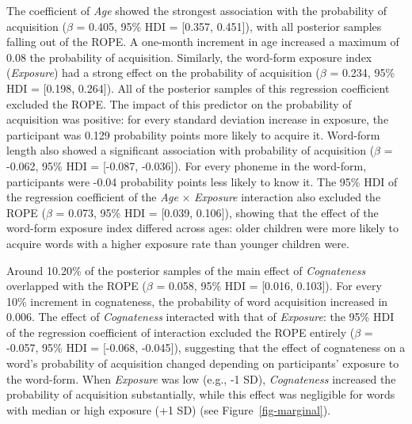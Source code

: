 \documentclass[
]{article}
\begin{document}
The coefficient of \emph{Age} showed the strongest association with the
probability of acquisition (\(\beta\) = 0.405, 95\% HDI = {[}0.357,
0.451{]}), with all posterior samples falling out of the ROPE. A
one-month increment in age increased a maximum of 0.08 the probability
of acquisition. Similarly, the word-form exposure index
(\emph{Exposure}) had a strong effect on the probability of acquisition
(\(\beta\) = 0.234, 95\% HDI = {[}0.198, 0.264{]}). All of the posterior
samples of this regression coefficient excluded the ROPE. The impact of
this predictor on the probability of acquisition was positive: for every
standard deviation increase in exposure, the participant was 0.129
probability points more likely to acquire it. Word-form length also
showed a significant association with probability of acquisition
(\(\beta\) = -0.062, 95\% HDI = {[}-0.087, -0.036{]}). For every phoneme
in the word-form, participants were -0.04 probability points less likely
to know it. The 95\% HDI of the regression coefficient of the \emph{Age}
\(\times\) \emph{Exposure} interaction also excluded the ROPE (\(\beta\)
= 0.073, 95\% HDI = {[}0.039, 0.106{]}), showing that the effect of the
word-form exposure index differed across ages: older children were more
likely to acquire words with a higher exposure rate than younger
children were.

Around 10.20\% of the posterior samples of the main effect of
\emph{Cognateness} overlapped with the ROPE (\(\beta\) = 0.058, 95\% HDI
= {[}0.016, 0.103{]}). For every 10\% increment in cognateness, the
probability of word acquisition increased in 0.006. The effect of
\emph{Cognateness} interacted with that of \emph{Exposure}: the 95\% HDI
of the regression coefficient of interaction excluded the ROPE entirely
(\(\beta\) = -0.057, 95\% HDI = {[}-0.068, -0.045{]}), suggesting that
the effect of cognateness on a word's probability of acquisition changed
depending on participants' exposure to the word-form. When
\emph{Exposure} was low (e.g., -1 SD), \emph{Cognateness} increased the
probability of acquisition substantially, while this effect was
negligible for words with median or high exposure (+1 SD) (see
Figure~\ref{fig-marginal}).
\end{document}
